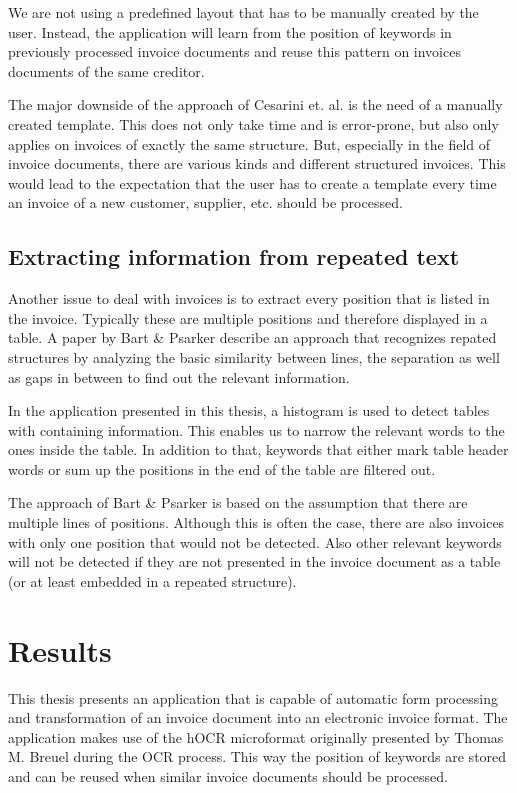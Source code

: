 We are not using a predefined layout that has to be manually created by the user. Instead, the application will learn from the position of keywords in previously processed invoice documents and reuse this pattern on invoices documents of the same creditor.

The major downside of the approach of Cesarini et. al. \cite{Cesarini98} is the need of a manually created template. This does not only take time and is error-prone, but also only applies on invoices of exactly the same structure. But, especially in the field of invoice documents, there are various kinds and different structured invoices. This would lead to the expectation that the user has to create a template every time an invoice of a new customer, supplier, etc. should be processed.

\subsection{Extracting information from repeated text}
Another issue to deal with invoices is to extract every position that is listed in the invoice. Typically these are multiple positions and therefore displayed in a table. A paper by Bart \& Psarker \cite{Bart10}  describe an approach that recognizes repated structures by analyzing the basic similarity between lines, the separation as well as gaps in between to find out the relevant information.

In the application presented in this thesis, a histogram is used to detect tables with containing information. This enables us to narrow the relevant words to the ones inside the table. In addition to that, keywords that either mark table header words or sum up the positions in the end of the table are filtered out.

The approach of Bart \& Psarker \cite{Bart10} is based on the assumption that there are multiple lines of positions. Although this is often the case, there are also invoices with only one position that would not be detected. Also other relevant keywords will not be detected if they are not presented in the invoice document as a table (or at least embedded in a repeated structure).


\section{Results}
\label{sec1.5}
This thesis presents an application that is capable of automatic form processing and transformation of an invoice document into an electronic invoice format. The application makes use of the hOCR microformat originally presented by Thomas M. Breuel \cite{Breuel07} during the OCR process. This way the position of keywords are stored and can be reused when similar invoice documents should be processed.

